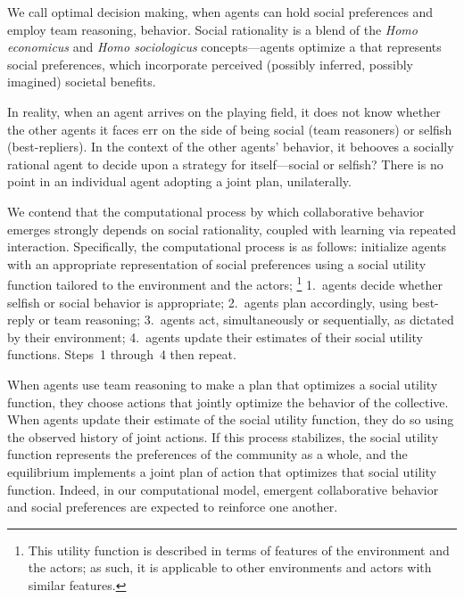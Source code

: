 We call optimal decision making, when agents can hold social
preferences and employ team reasoning, 
behavior.  Social rationality is a blend of the \emph{Homo
  economicus\/} and \emph{Homo sociologicus\/} concepts---agents
optimize a  that
represents social preferences, which incorporate perceived (possibly
inferred, possibly imagined) societal benefits.

In reality, when an agent arrives on the playing field, it does not
know whether the other agents it faces err on the side of being social
(team reasoners) or selfish (best-repliers).  In the context of the other agents' behavior,
it behooves a socially rational agent to decide upon a strategy
for itself---social or selfish?  There is no point in an individual
agent adopting a joint plan, unilaterally.

We contend that the computational process by which collaborative
behavior emerges strongly depends on social rationality, coupled with
learning via repeated interaction.
%
Specifically, the computational process is as follows: initialize
agents with an appropriate representation of social preferences using
a social utility function tailored to the environment and the actors;%
\footnote{This utility function is described in terms of features of the environment and the actors;
as such, it is applicable to other environments and actors with similar features.}
1.~agents decide whether selfish or social behavior is appropriate;
2.~agents plan accordingly, using best-reply or team reasoning;
3.~agents act, simultaneously or sequentially, as dictated by their environment;
4.~agents update their estimates of their social utility functions.
Steps~1 through~4 then repeat.

When agents use team reasoning to make a plan that optimizes a social
utility function, they choose actions that jointly optimize the
behavior of the collective.
When agents update their estimate of the social utility function, they
do so using the observed history of joint actions.
If this process stabilizes, the social utility function represents the
preferences of the community as a whole, 
and the equilibrium implements a joint plan of action that optimizes
that social utility function.  Indeed, in our computational model,
emergent collaborative behavior and social preferences are expected to
reinforce one another.

